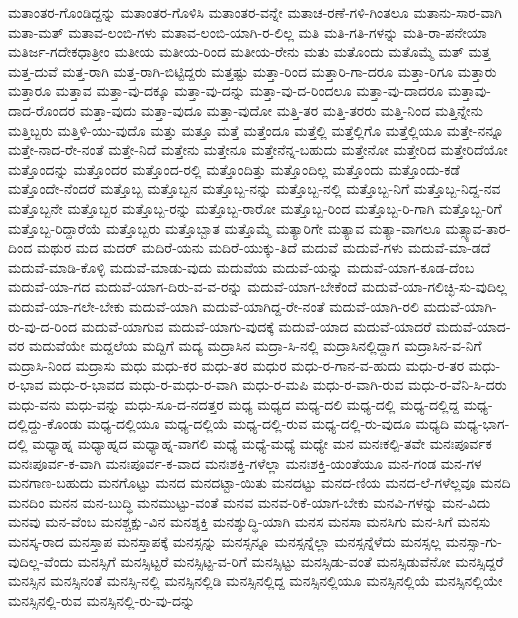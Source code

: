 {ಮತಾಂತರ-ಗೊಂಡಿದ್ದನ್ನು
ಮತಾಂತರ-ಗೊಳಿಸಿ
ಮತಾಂತರ-ವನ್ನೇ
ಮತಾಚ-ರಣೆ-ಗಳಿ-ಗಿಂತಲೂ
ಮತಾನು-ಸಾರ-ವಾಗಿ
ಮತಾ-ಮತ್
ಮತಾವ-ಲಂಬಿ-ಗಳು
ಮತಾವ-ಲಂಬಿ-ಯಾಗಿ-ರ-ಲಿಲ್ಲ
ಮತಿ
ಮತಿ-ಗತಿ-ಗಳನ್ನು
ಮತಿ-ರಾ-ಪನೇಯಾ
ಮತಿರ್ಜ-ಗದೇಕಧಾತ್ರೀಂ
ಮತೀಯ
ಮತೀಯ-ರಿಂದ
ಮತೀಯ-ರೇನು
ಮತು
ಮತೊಂದು
ಮತೊಮ್ಮೆ
ಮತ್
ಮತ್ತ
ಮತ್ತ-ದುವೆ
ಮತ್ತ-ರಾಗಿ
ಮತ್ತ-ರಾಗಿ-ಬಿಟ್ಟಿದ್ದರು
ಮತ್ತಷ್ಟು
ಮತ್ತಾ-ರಿಂದ
ಮತ್ತಾರಿ-ಗಾ-ದರೂ
ಮತ್ತಾ-ರಿಗೂ
ಮತ್ತಾರು
ಮತ್ತಾರೂ
ಮತ್ತಾವ
ಮತ್ತಾ-ವು-ದಕ್ಕೂ
ಮತ್ತಾ-ವು-ದನ್ನು
ಮತ್ತಾ-ವು-ದ-ರಿಂದಲೂ
ಮತ್ತಾ-ವು-ದಾದರೂ
ಮತ್ತಾವು-ದಾದ-ರೊಂದರ
ಮತ್ತಾ-ವುದು
ಮತ್ತಾ-ವುದೂ
ಮತ್ತಾ-ವುದೋ
ಮತ್ತಿ-ತರ
ಮತ್ತಿ-ತರರು
ಮತ್ತಿ-ನಿಂದ
ಮತ್ತಿನ್ನೇನು
ಮತ್ತಿಬ್ಬರು
ಮತ್ತಿಳಿ-ಯು-ವುದೊ
ಮತ್ತು
ಮತ್ತೂ
ಮತ್ತೆ
ಮತ್ತೆಂದೂ
ಮತ್ತೆಲ್ಲಿ
ಮತ್ತೆಲ್ಲಿಗೊ
ಮತ್ತೆಲ್ಲಿಯೂ
ಮತ್ತೇ-ನನ್ನೂ
ಮತ್ತೇ-ನಾದ-ರೇ-ನಂತೆ
ಮತ್ತೇ-ನಿದೆ
ಮತ್ತೇನು
ಮತ್ತೇನೂ
ಮತ್ತೇನೆನ್ನ-ಬಹುದು
ಮತ್ತೇನೋ
ಮತ್ತೇರಿದ
ಮತ್ತೇರಿದೆಯೋ
ಮತ್ತೊಂದನ್ನು
ಮತ್ತೊಂದರ
ಮತ್ತೊಂದ-ರಲ್ಲಿ
ಮತ್ತೊಂದಿತ್ತು
ಮತ್ತೊಂದಿಲ್ಲ
ಮತ್ತೊಂದು
ಮತ್ತೊಂದು-ಕಡೆ
ಮತ್ತೊಂದೇ-ನೆಂದರೆ
ಮತ್ತೊಬ್ಬ
ಮತ್ತೊಬ್ಬನ
ಮತ್ತೊಬ್ಬ-ನನ್ನು
ಮತ್ತೊಬ್ಬ-ನಲ್ಲಿ
ಮತ್ತೊಬ್ಬ-ನಿಗೆ
ಮತ್ತೊಬ್ಬ-ನಿದ್ದ-ನವ
ಮತ್ತೊಬ್ಬನೇ
ಮತ್ತೊಬ್ಬರ
ಮತ್ತೊಬ್ಬ-ರನ್ನು
ಮತ್ತೊಬ್ಬ-ರಾರೋ
ಮತ್ತೊಬ್ಬ-ರಿಂದ
ಮತ್ತೊಬ್ಬ-ರಿ-ಗಾಗಿ
ಮತ್ತೊಬ್ಬ-ರಿಗೆ
ಮತ್ತೊಬ್ಬ-ರಿದ್ದಾರೆಯೆ
ಮತ್ತೊಬ್ಬರು
ಮತ್ತೊಬ್ಬಾತ
ಮತ್ತೊಮ್ಮೆ
ಮತ್ಯಾರಿಗೇ
ಮತ್ಯಾವ
ಮತ್ಯಾ-ವಾಗಲೂ
ಮತ್ಸ್ಯಾವ-ತಾರ-ದಿಂದ
ಮಥುರ
ಮದ
ಮದರ್
ಮದಿರೆ-ಯನು
ಮದಿರೆ-ಯುಕ್ಕು-ತಿದೆ
ಮದುವೆ
ಮದುವೆ-ಗಳು
ಮದುವೆ-ಮಾ-ಡದೆ
ಮದುವೆ-ಮಾಡಿ-ಕೊಳ್ಳಿ
ಮದುವೆ-ಮಾಡು-ವುದು
ಮದುವೆಯ
ಮದುವೆ-ಯನ್ನು
ಮದುವೆ-ಯಾಗ-ಕೂಡ-ದೆಂಬ
ಮದುವೆ-ಯಾ-ಗದ
ಮದುವೆ-ಯಾಗ-ದಿರು-ವ-ವ-ರನ್ನು
ಮದುವೆ-ಯಾಗ-ಬೇಕೆಂದೆ
ಮದುವೆ-ಯಾ-ಗಲಿಚ್ಛಿ-ಸು-ವುದಿಲ್ಲ
ಮದುವೆ-ಯಾ-ಗಲೇ-ಬೇಕು
ಮದುವೆ-ಯಾಗಿ
ಮದುವೆ-ಯಾಗಿದ್ದ-ರೇ-ನಂತೆ
ಮದುವೆ-ಯಾಗಿ-ರಲಿ
ಮದುವೆ-ಯಾಗಿ-ರು-ವು-ದ-ರಿಂದ
ಮದುವೆ-ಯಾಗುವ
ಮದುವೆ-ಯಾಗು-ವುದಕ್ಕೆ
ಮದುವೆ-ಯಾದ
ಮದುವೆ-ಯಾದರೆ
ಮದುವೆ-ಯಾದ-ವರ
ಮದುವೆಯೇ
ಮದ್ದಲೆಯ
ಮದ್ದಿಗೆ
ಮದ್ಯ
ಮದ್ರಾಸಿನ
ಮದ್ರಾ-ಸಿ-ನಲ್ಲಿ
ಮದ್ರಾಸಿನಲ್ಲಿದ್ದಾಗ
ಮದ್ರಾಸಿನ-ವ-ನಿಗೆ
ಮದ್ರಾಸಿ-ನಿಂದ
ಮದ್ರಾಸು
ಮಧು
ಮಧು-ಕರ
ಮಧು-ತರ
ಮಧುರ
ಮಧು-ರ-ಗಾನ-ವ-ಹುದು
ಮಧು-ರ-ತರ
ಮಧು-ರ-ಭಾವ
ಮಧು-ರ-ಭಾವದ
ಮಧು-ರ-ಮಧು-ರ-ವಾಗಿ
ಮಧು-ರ-ಮಪಿ
ಮಧು-ರ-ವಾಗಿ-ರುವ
ಮಧು-ರ-ವೆನಿ-ಸಿ-ದರು
ಮಧು-ವನು
ಮಧು-ವನ್ನು
ಮಧು-ಸೂ-ದ-ನದತ್ತರ
ಮಧ್ಯ
ಮಧ್ಯದ
ಮಧ್ಯ-ದಲಿ
ಮಧ್ಯ-ದಲ್ಲಿ
ಮಧ್ಯ-ದಲ್ಲಿದ್ದ
ಮಧ್ಯ-ದಲ್ಲಿದ್ದು-ಕೊಂಡು
ಮಧ್ಯ-ದಲ್ಲಿಯೂ
ಮಧ್ಯ-ದಲ್ಲಿಯೆ
ಮಧ್ಯ-ದಲ್ಲಿ-ರುವ
ಮಧ್ಯ-ದಲ್ಲಿ-ರು-ವುದೂ
ಮಧ್ಯದಿ
ಮಧ್ಯ-ಭಾಗ-ದಲ್ಲಿ
ಮಧ್ಯಾಹ್ನ
ಮಧ್ಯಾಹ್ನದ
ಮಧ್ಯಾಹ್ನ-ವಾಗಲಿ
ಮಧ್ಯೆ
ಮಧ್ಯೆ-ಮಧ್ಯೆ
ಮಧ್ಯೇ
ಮನ
ಮನಃಕಲ್ಪಿ-ತವೇ
ಮನಃಪೂರ್ವಕ
ಮನಃಪೂರ್ವ-ಕ-ವಾಗಿ
ಮನಃಪೂರ್ವ-ಕ-ವಾದ
ಮನಃಶಕ್ತಿ-ಗಳೆಲ್ಲಾ
ಮನಃಶಕ್ತಿ-ಯಂತೆಯೂ
ಮನ-ಗಂಡ
ಮನ-ಗಳ
ಮನಗಾಣ-ಬಹುದು
ಮನಗೊಟ್ಟು
ಮನದ
ಮನದಟ್ಟಾ-ಯಿತು
ಮನದಟ್ಟು
ಮನದ-ಣಿಯ
ಮನದ-ಲೆ-ಗಳೆಲ್ಲವೂ
ಮನದಿ
ಮನದಿಂ
ಮನನ
ಮನ-ಬುದ್ಧಿ
ಮನಮುಟ್ಟು-ವಂತೆ
ಮನವ
ಮನವ-ರಿಕೆ-ಯಾಗ-ಬೇಕು
ಮನವಿ-ಗಳನ್ನು
ಮನ-ವಿದು
ಮನವು
ಮನ-ವೆಂಬ
ಮನಶ್ಚಕ್ಷು-ವಿನ
ಮನಶ್ಶಕ್ತಿ
ಮನಶ್ಶುದ್ಧಿ-ಯಾಗಿ
ಮನಸ
ಮನಸಾ
ಮನಸಿಗು
ಮನ-ಸಿಗೆ
ಮನಸು
ಮನಸ್ಕ-ರಾದ
ಮನಸ್ತಾಪ
ಮನಸ್ತಾಪಕ್ಕೆ
ಮನಸ್ಸನ್ನು
ಮನಸ್ಸನ್ನೂ
ಮನಸ್ಸನ್ನೆಲ್ಲಾ
ಮನಸ್ಸನ್ನೆಳೆದು
ಮನಸ್ಸಲ್ಲ
ಮನಸ್ಸಾ-ಗು-ವುದಿಲ್ಲ-ವೆಂದು
ಮನಸ್ಸಿಗೆ
ಮನಸ್ಸಿಟ್ಟರೆ
ಮನಸ್ಸಿಟ್ಟ-ವ-ರಿಗೆ
ಮನಸ್ಸಿಟ್ಟು
ಮನಸ್ಸಿಡು-ವಂತೆ
ಮನಸ್ಸಿಡುವೆನೋ
ಮನಸ್ಸಿದ್ದರೆ
ಮನಸ್ಸಿನ
ಮನಸ್ಸಿನಂತೆ
ಮನಸ್ಸಿ-ನಲ್ಲಿ
ಮನಸ್ಸಿನಲ್ಲಿಡಿ
ಮನಸ್ಸಿನಲ್ಲಿದ್ದ
ಮನಸ್ಸಿನಲ್ಲಿಯೂ
ಮನಸ್ಸಿನಲ್ಲಿಯೆ
ಮನಸ್ಸಿನಲ್ಲಿಯೇ
ಮನಸ್ಸಿನಲ್ಲಿ-ರುವ
ಮನಸ್ಸಿನಲ್ಲಿ-ರು-ವು-ದನ್ನು
}
